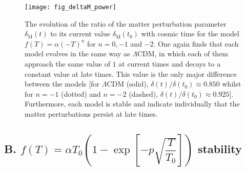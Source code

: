 \documentclass[prl,floatfix,showpacs,twocolumn,preprintnumbers,amsmath,amssymb,superscriptaddress]{revtex4}
\begin{document}
\begin{figure}[h!]
\texttt{[image: fig\_deltaM\_power]}
\caption{The evolution of the ratio of the matter perturbation parameter $\delta_\text{M}(t)$ to its current value $\delta_\text{M} \left(t_0\right)$ with cosmic time for the model $f(T) = \alpha \left(-T\right)^n$ for $n = 0, -1$ and $-2$. One again finds that each model evolves in the same way as $\Lambda$CDM, in which each of them approach the same value of $1$ at current times and decays to a constant value at late times. This value is the only major difference between the models [for $\Lambda$CDM (solid), $\delta(t)/\delta\left(t_0\right) \approx 0.850$ whilst for $n = -1$ (dotted) and $n = -2$ (dashed), $\delta(t)/\delta\left(t_0\right) \approx 0.925$]. Furthermore, each model is stable and indicate individually that the matter perturbations persist at late times.}
\label{fig:fig_deltaM_power}
\end{figure}

\subsection{B. $f(T) = \alpha T_0 \left(1 - \exp \left[-p \sqrt{\dfrac{T}{T_0}}\right]\right)$ stability}
\end{document}
